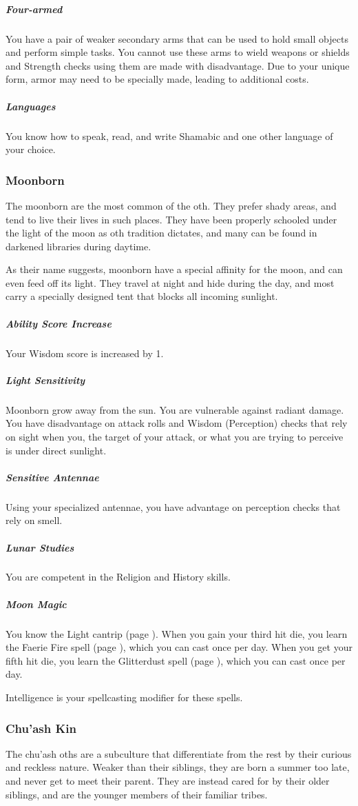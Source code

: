 \subparagraph{Four-armed} You have a pair of weaker secondary arms that can be used to hold small objects and perform simple tasks.
You cannot use these arms to wield weapons or shields and Strength checks using them are made with disadvantage.
Due to your unique form, armor may need to be specially made, leading to additional costs.

\subparagraph{Languages} You know how to speak, read, and write Shamabic and one other language of your choice.

\subsubsection{Moonborn}
The moonborn are the most common of the oth.
They prefer shady areas, and tend to live their lives in such places.
They have been properly schooled under the light of the moon as oth tradition dictates, and many can be found in darkened libraries during daytime.

As their name suggests, moonborn have a special affinity for the moon, and can even feed off its light.
They travel at night and hide during the day, and most carry a specially designed tent that blocks all incoming sunlight.

\subparagraph{Ability Score Increase} Your Wisdom score is increased by 1.

\subparagraph{Light Sensitivity} Moonborn grow away from the sun.
You are vulnerable against radiant damage.
You have disadvantage on attack rolls and Wisdom (Perception) checks that rely on sight when you, the target of your attack, or what you are trying to perceive is under direct sunlight.

\subparagraph{Sensitive Antennae} Using your specialized antennae, you have advantage on perception checks that rely on smell.

\subparagraph{Lunar Studies} You are competent in the Religion and History skills.

\subparagraph{Moon Magic} You know the Light cantrip (page \pageref{spell::light}).
When you gain your third hit die, you learn the Faerie Fire spell (page \pageref{spell::faeriefire}), which you can cast once per day.
When you get your fifth hit die, you learn the Glitterdust spell (page \pageref{spell::glitterdust}), which you can cast once per day.

Intelligence is your spellcasting modifier for these spells.

\subsubsection{Chu'ash Kin}
The chu'ash oths are a subculture that differentiate from the rest by their curious and reckless nature.
Weaker than their siblings, they are born a summer too late, and never get to meet their parent.
They are instead cared for by their older siblings, and are the younger members of their familiar tribes.

